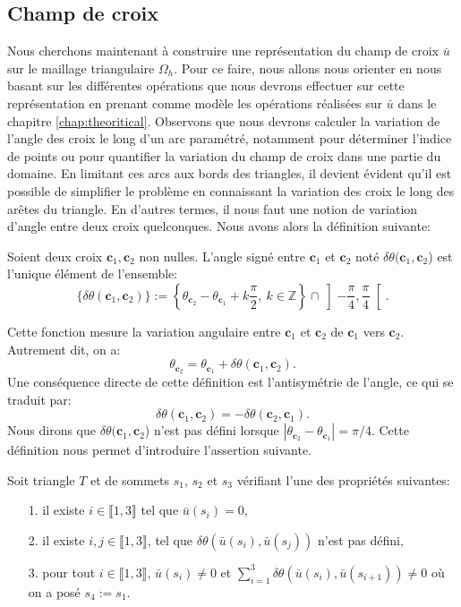 \subsection{Champ de croix}

Nous cherchons maintenant à construire une représentation du champ de croix $\bar{u}$ sur le maillage triangulaire $\Omega_h$. Pour ce faire, nous allons nous orienter en nous basant sur les différentes opérations que nous devrons effectuer sur cette représentation en prenant comme modèle les opérations réalisées sur $\bar{u}$ dans le chapitre \ref{chap:theoritical}. Observons que nous devrons calculer la variation de l'angle des croix le long d'un arc paramétré, notamment pour déterminer l'indice de points ou pour quantifier la variation du champ de croix dans une partie du domaine. En limitant ces arcs aux bords des triangles, il devient évident qu'il est possible de simplifier le problème en connaissant la variation des croix le long des arêtes du triangle. En d'autres termes, il nous faut une notion de variation d'angle entre deux croix quelconques. Nous avons alors la définition suivante:

\begin{definition}
Soient deux croix $\mathbf{c}_1,\mathbf{c}_2$ non nulles. L'angle signé entre $\mathbf{c}_1$ et $\mathbf{c}_2$ noté $\delta\theta(\mathbf{c}_1,\mathbf{c}_2$) est l'unique élément de l'ensemble:
$$
\{\delta\theta(\mathbf{c}_1,\mathbf{c}_2)\}:=\left\{\theta_{\mathbf{c}_2}-\theta_{\mathbf{c}_1}+k\frac{\pi}{2},~k\in\mathbb{Z}\right\}\cap\left]-\frac{\pi}{4}, \frac{\pi}{4}\right[.
$$
\end{definition}
Cette fonction mesure la variation angulaire entre $\mathbf{c}_1$ et $\mathbf{c}_2$ de $\mathbf{c}_1$ vers $\mathbf{c}_2$. Autrement dit, on a:
$$
\theta_{\mathbf{c}_2}=\theta_{\mathbf{c}_1}+\delta\theta(\mathbf{c}_1,\mathbf{c}_2).
$$
Une conséquence directe de cette définition est l'antisymétrie de l'angle, ce qui se traduit par:
$$
\delta\theta(\mathbf{c}_1, \mathbf{c}_2)=-\delta\theta(\mathbf{c}_2,\mathbf{c}_1).
$$
Nous dirons que $\delta\theta(\mathbf{c}_1,\mathbf{c}_2$) n'est pas défini lorsque $|\theta_{\mathbf{c}_2}-\theta_{\mathbf{c}_1}|=\pi/4$.
Cette définition nous permet d'introduire l'assertion suivante.
\begin{assertion}
\label{ass:triangle_singulier}
 Soit triangle $T$ et de sommets $s_1$, $s_2$ et $s_3$ vérifiant l'une des propriétés suivantes:\\
 \begin{itemize}
  \item[1.] il existe $i\in\llbracket 1, 3\rrbracket$ tel que $\bar{u}(s_i)=0$,\\%
  \item[2.] il existe  $i,j\in\llbracket 1, 3\rrbracket$, tel que  $\delta\theta(\bar{u}(s_i),\bar{u}(s_{j}))$ n'est pas défini,\\%
  \item[3.] pour tout $i\in\llbracket 1, 3\rrbracket$, $\bar{u}(s_i)\neq 0$ et $\sum_{i=1}^3\delta\theta(\bar{u}(s_i),\bar{u}(s_{i+1}))\neq 0$ où on a posé $s_4:=s_1$.\\[-0.2cm]
 \end{itemize}
\end{assertion}

